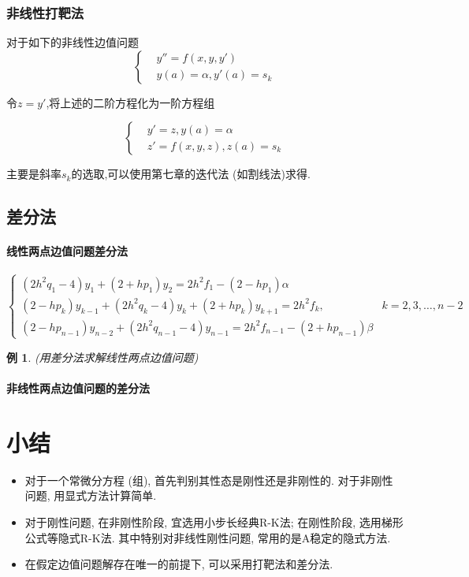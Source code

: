 \documentclass[twoside]{article}
\newtheorem{eg}{例}[section]
\begin{document}
\subsubsection{非线性打靶法}\label{ssub:fei_xian_xing_da_ba_fa_}
对于如下的非线性边值问题
\begin{equation}
  \left\{
    \begin{aligned}
      & y''=f(x,y,y') \\
      & y(a)=\alpha, y'(a)=s_k
    \end{aligned}
  \right.
\end{equation}

令$z=y'$,将上述的二阶方程化为一阶方程组

\begin{equation}
  \left\{
    \begin{aligned}
      & y'=z, y(a)=\alpha\\
      & z' = f(x,y,z), z(a)=s_k
    \end{aligned}
  \right.
\end{equation}

主要是斜率$s_k$的选取,可以使用第七章的迭代法 (如割线法)求得.

\subsection{差分法}\label{sub:chai_fen_fa_}
\paragraph{线性两点边值问题差分法}
\begin{equation}
  \begin{cases}{}
    (2h^2q_1-4)y_1 + (2+hp_1)y_2 = 2h^2f_1 - (2-hp_1)\alpha \\
    (2-hp_k)y_{k-1} + (2h^2q_k-4)y_k + (2+hp_k) y_{k+1} = 2h^2f_k, &k=2,3,\ldots,n-2 \\
    (2-hp_{n-1})y_{n-2} + (2h^2q_{n-1} -4)y_{n-1} = 2h^2f_{n-1} - (2+hp_{n-1})\beta
  \end{cases}
\end{equation}
\begin{eg}
  (用差分法求解线性两点边值问题)
\end{eg}
\paragraph{非线性两点边值问题的差分法}

\section{小结}\label{sec:xiao_jie_}
  \begin{itemize}
    \item 对于一个常微分方程 (组), 首先判别其性态是刚性还是非刚性的. 对于非刚性问题, 用显式方法计算简单.
    \item 对于刚性问题, 在非刚性阶段, 宜选用小步长经典R-K法; 在刚性阶段, 选用梯形公式等隐式R-K法. 其中特别对非线性刚性问题, 常用的是A稳定的隐式方法.
    \item 在假定边值问题解存在唯一的前提下, 可以采用打靶法和差分法.
  \end{itemize}
\end{document}
